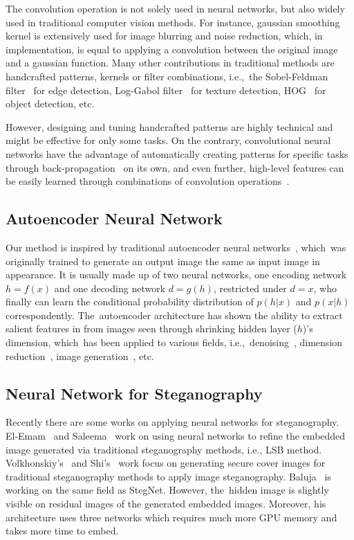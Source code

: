 \documentclass[futureinternet,article,accept,moreauthors,pdftex,10pt,a4paper]{Definitions/mdpi}
\begin{document}
The convolution operation is not solely used in neural networks, but also widely used in traditional computer vision methods. For instance, gaussian smoothing kernel is extensively used for image blurring and noise reduction, which, in implementation, is equal to applying a convolution between the original image and a gaussian function. Many other contributions in traditional methods are handcrafted patterns, kernels or filter combinations, i.e.,\ the Sobel-Feldman filter~\cite{SobelFeldmanFilter} for edge detection, Log-Gabol filter~\cite{fischer07cv} for texture detection, HOG~\cite{HOG} for object detection, etc.

However, designing and tuning handcrafted patterns are highly technical and might be effective for only some tasks. On the contrary, convolutional neural networks have the advantage of automatically creating patterns for specific tasks through back-propagation~\cite{RumelhartBP} on its own, and even further, high-level features can be easily learned through combinations of convolution operations~\cite{Zeiler_Fergus_2013, olah2017feature,Mahendran_Vedaldi_2014}.

\subsection{Autoencoder Neural Network}%
\label{ssec:autoencoder}

Our method is inspired by traditional autoencoder neural networks~\cite{hinton1994autoencoders}, which~was originally trained to generate an output image the same as input image in appearance. It is usually made up of two neural networks, one encoding network \(h = f(x)\) and one decoding network \(d = g(h)\), restricted under \(d = x\), who finally can learn the conditional probability distribution of \(p(h|x)\) and \(p(x|h)\) correspondently. The~autoencoder architecture has shown the ability to extract salient features in from images seen through shrinking hidden layer (\(h\))'s dimension, which~has been applied to various fields, i.e.,\ denoising~\cite{vincent2008extracting}, dimension reduction~\cite{wang2014generalized}, image generation~\cite{VAE}, etc.

\subsection{Neural Network for Steganography}%
\label{ssec:nnsteg}

Recently there are some works on applying neural networks for steganography. El-Emam~\cite{El-emam_2008} and Saleema~\cite{Saleema_Amarunnishad_2016} work on using neural networks to refine the embedded image generated via traditional steganography methods, i.e., LSB method. Volkhonskiy's~\cite{SGAN} and Shi's~\cite{SSGAN} work focus on generating secure cover images for traditional steganography methods to apply image steganography. Baluja~\cite{Baluja_2017} is working on the same field as StegNet. However, the~hidden image is slightly visible on residual images of the generated embedded images. Moreover, his architecture uses three networks which requires much more GPU memory and takes more time to embed.
\end{document}
